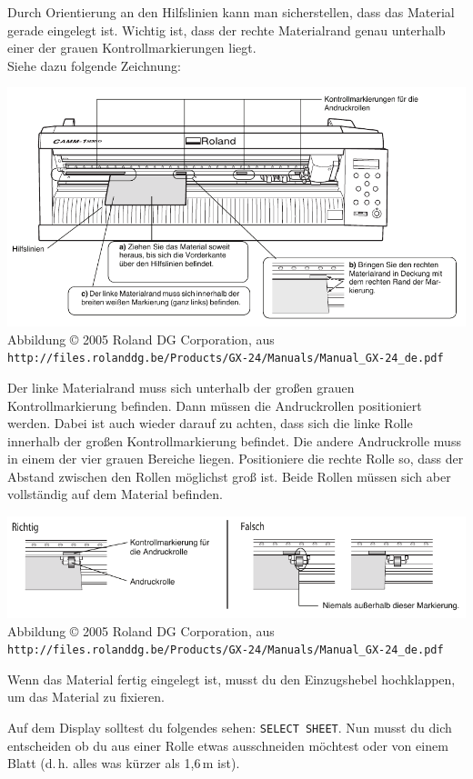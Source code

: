 \documentclass{\basedir/fablab-document}
\newcommand{\plotterDisplay}[1]{\texttt{#1}}
\newcommand{\RolandCopyrightHinweis}{Abbildung \copyright{} 2005 Roland DG Corporation, aus \texttt{\tiny http://files.rolanddg.be/Products/GX-24/Manuals/Manual\_GX-24\_de.pdf}}
\begin{document}
Durch Orientierung an den Hilfslinien kann man sicherstellen, dass das Material gerade eingelegt ist.
Wichtig ist, dass der rechte Materialrand genau unterhalb einer der grauen Kontrollmarkierungen liegt. \\
Siehe dazu folgende Zeichnung:
\begin{center}
 \includegraphics[width=\textwidth]{img/kontrollmarkierungen} \\
 \RolandCopyrightHinweis
\end{center}

Der linke Materialrand muss sich unterhalb der großen grauen Kontrollmarkierung befinden.
Dann müssen die Andruckrollen positioniert werden.
Dabei ist auch wieder darauf zu achten, dass sich  die linke Rolle innerhalb der großen Kontrollmarkierung befindet.
Die andere Andruckrolle muss in einem der vier grauen Bereiche liegen.
Positioniere die rechte Rolle so, dass der Abstand zwischen den Rollen möglichst groß ist.
Beide Rollen müssen sich aber vollständig auf dem Material befinden.  

\begin{center}
 \includegraphics[width=\textwidth]{img/andruckrollen} \\
 \RolandCopyrightHinweis
\end{center}

Wenn das Material fertig eingelegt ist, musst du den Einzugshebel hochklappen, um das Material zu fixieren.

Auf dem Display solltest du folgendes sehen: \plotterDisplay{SELECT SHEET}.
Nun musst du dich entscheiden ob du aus einer Rolle etwas ausschneiden möchtest oder von einem Blatt (d.\,h. alles was kürzer als 1,6\,m ist).
\end{document}
